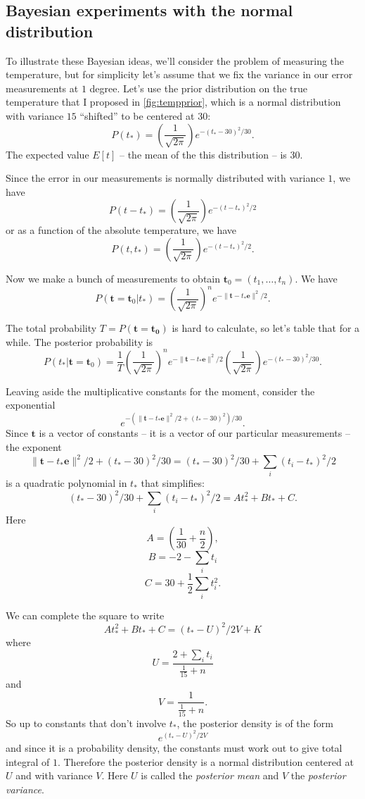 \documentclass[
  oneside]{scrbook}
\begin{document}
\hypertarget{bayesian-experiments-with-the-normal-distribution}{%
\subsection{Bayesian experiments with the normal
distribution}\label{bayesian-experiments-with-the-normal-distribution}}

To illustrate these Bayesian ideas, we'll consider the problem of
measuring the temperature, but for simplicity let's assume that we fix
the variance in our error measurements at \(1\) degree. Let's use the
prior distribution on the true temperature that I proposed in
\cref{fig:tempprior}, which is a normal distribution with variance
\(15\) ``shifted'' to be centered at \(30\): \[
P(t_*)=\left(\frac{1}{\sqrt{2\pi}}\right)e^{-(t_*-30)^2/30}.
\] The expected value \(E[t]\) -- the mean of the this distribution --
is \(30\).

Since the error in our measurements is normally distributed with
variance \(1\), we have \[
P(t-t_{*})=\left(\frac{1}{\sqrt{2\pi}}\right)e^{-(t-t_{*})^2/2}
\] or as a function of the absolute temperature, we have \[
P(t,t_{*}) = \left(\frac{1}{\sqrt{2\pi}}\right)e^{-(t-t_*)^2/2}.
\]

Now we make a bunch of measurements to obtain
\(\mathbf{t}_0=(t_1,\ldots, t_n)\). We have \[
P(\mathbf{t}=\mathbf{t}_0|t_{*}) = \left(\frac{1}{\sqrt{2\pi}}\right)^ne^{-\|\mathbf{t}-t_*\mathbf{e}\|^2/2}.
\]

The total probability \(T=P(\mathbf{t}=\mathbf{t_0})\) is hard to
calculate, so let's table that for a while. The posterior probability is
\[
P(t_{*}|\mathbf{t}=\mathbf{t}_{0}) = \frac{1}{T} 
\left(\frac{1}{\sqrt{2\pi}}\right)^ne^{-\|\mathbf{t}-t_*\mathbf{e}\|^2/2}
\left(\frac{1}{\sqrt{2\pi}}\right)e^{-(t_*-30)^2/30}.
\]

Leaving aside the multiplicative constants for the moment, consider the
exponential \[
e^{-(\|\mathbf{t}-t_{*}\mathbf{e}\|^2/2+(t_{*}-30)^2)/30}.
\] Since \(\mathbf{t}\) is a vector of constants -- it is a vector of
our particular measurements -- the exponent \[
\|\mathbf{t}-t_{*}\mathbf{e}\|^2/2+(t_{*}-30)^2/30 = (t_{*}-30)^2/30+\sum_{i} (t_{i}-t_{*})^2/2
\] is a quadratic polynomial in \(t_{*}\) that simplifies: \[
(t_{*}-30)^2/30+\sum_{i} (t_{i}-t_{*})^2/2 = At_{*}^2+Bt_{*}+C.
\] Here \[
A=(\frac{1}{30}+\frac{n}{2}),
\] \[
B=-2-\sum_{i} t_{i}
\] \[
C=30+\frac{1}{2}\sum_{i} t_{i}^2.
\]

We can complete the square to write \[
At_{*}^2+Bt_{*}+C = (t_{*}-U)^2/2V +K
\] where \[
U=\frac{2+\sum_{i}t_{i}}{\frac{1}{15}+n}
\] and \[ 
V=\frac{1}{\frac{1}{15}+n}.
\] So up to constants that don't involve \(t_{*}\), the posterior
density is of the form \[
e^{(t_{*}-U)^2/2V}
\] and since it is a probability density, the constants must work out to
give total integral of \(1\). Therefore the posterior density is a
normal distribution centered at \(U\) and with variance \(V\). Here
\(U\) is called the \emph{posterior mean} and \(V\) the \emph{posterior
variance}.
\end{document}
